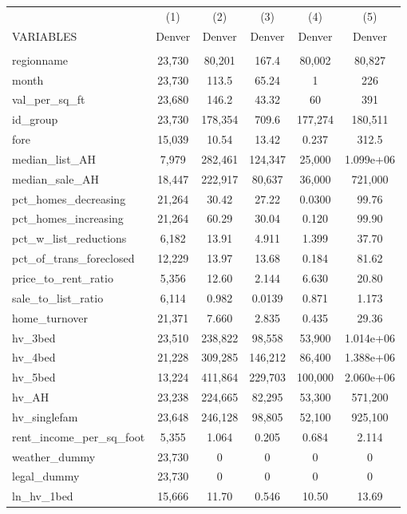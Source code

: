 \begin{tabular}{lccccc} \hline
 & (1) & (2) & (3) & (4) & (5) \\
VARIABLES & Denver & Denver & Denver & Denver & Denver \\ \hline
 &  &  &  &  &  \\
regionname & 23,730 & 80,201 & 167.4 & 80,002 & 80,827 \\
month & 23,730 & 113.5 & 65.24 & 1 & 226 \\
val\_per\_sq\_ft & 23,680 & 146.2 & 43.32 & 60 & 391 \\
id\_group & 23,730 & 178,354 & 709.6 & 177,274 & 180,511 \\
fore & 15,039 & 10.54 & 13.42 & 0.237 & 312.5 \\
median\_list\_AH & 7,979 & 282,461 & 124,347 & 25,000 & 1.099e+06 \\
median\_sale\_AH & 18,447 & 222,917 & 80,637 & 36,000 & 721,000 \\
pct\_homes\_decreasing & 21,264 & 30.42 & 27.22 & 0.0300 & 99.76 \\
pct\_homes\_increasing & 21,264 & 60.29 & 30.04 & 0.120 & 99.90 \\
pct\_w\_list\_reductions & 6,182 & 13.91 & 4.911 & 1.399 & 37.70 \\
pct\_of\_trans\_foreclosed & 12,229 & 13.97 & 13.68 & 0.184 & 81.62 \\
price\_to\_rent\_ratio & 5,356 & 12.60 & 2.144 & 6.630 & 20.80 \\
sale\_to\_list\_ratio & 6,114 & 0.982 & 0.0139 & 0.871 & 1.173 \\
home\_turnover & 21,371 & 7.660 & 2.835 & 0.435 & 29.36 \\
hv\_3bed & 23,510 & 238,822 & 98,558 & 53,900 & 1.014e+06 \\
hv\_4bed & 21,228 & 309,285 & 146,212 & 86,400 & 1.388e+06 \\
hv\_5bed & 13,224 & 411,864 & 229,703 & 100,000 & 2.060e+06 \\
hv\_AH & 23,238 & 224,665 & 82,295 & 53,300 & 571,200 \\
hv\_singlefam & 23,648 & 246,128 & 98,805 & 52,100 & 925,100 \\
rent\_income\_per\_sq\_foot & 5,355 & 1.064 & 0.205 & 0.684 & 2.114 \\
weather\_dummy & 23,730 & 0 & 0 & 0 & 0 \\
legal\_dummy & 23,730 & 0 & 0 & 0 & 0 \\
ln\_hv\_1bed & 15,666 & 11.70 & 0.546 & 10.50 & 13.69 \\

\end{tabular}

